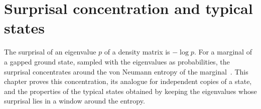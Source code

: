 \chapter{Surprisal concentration and typical states}
\label{ch:surprisal_concentration}

The surprisal of an eigenvalue $p$ of a density matrix is $-\log p$. For a
marginal of a gapped ground state, sampled with the eigenvalues as
probabilities, the surprisal concentrates around the von Neumann entropy of the
marginal~\cite[Lemma~3.1]{OpenAI2026AreaLaw}. This chapter proves this
concentration, its analogue for independent copies of a state, and the
properties of the typical states obtained by keeping the eigenvalues whose
surprisal lies in a window around the entropy.


















